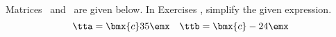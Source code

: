 {\noin Matrices \tta\ and \ttb\ are given below. In Exercises}
{, simplify the given expression.
$$\tta = \bmx{c} 3\\ 5\emx \quad \ttb = \bmx{c} -2\\4\emx$$}
